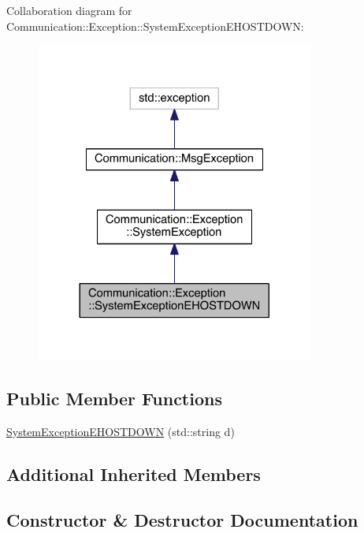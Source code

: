 Collaboration diagram for Communication\+:\+:Exception\+:\+:System\+Exception\+E\+H\+O\+S\+T\+D\+O\+W\+N\+:\nopagebreak
\begin{figure}[H]
\begin{center}
\leavevmode
\includegraphics[width=260pt]{class_communication_1_1_exception_1_1_system_exception_e_h_o_s_t_d_o_w_n__coll__graph}
\end{center}
\end{figure}
\subsection*{Public Member Functions}
\begin{DoxyCompactItemize}
\item 
\hyperlink{class_communication_1_1_exception_1_1_system_exception_e_h_o_s_t_d_o_w_n_ac520fab973baa441d5e67d68ac7cbdc7}{System\+Exception\+E\+H\+O\+S\+T\+D\+O\+W\+N} (std\+::string d)
\end{DoxyCompactItemize}
\subsection*{Additional Inherited Members}


\subsection{Constructor \& Destructor Documentation}
\hypertarget{class_communication_1_1_exception_1_1_system_exception_e_h_o_s_t_d_o_w_n_ac520fab973baa441d5e67d68ac7cbdc7}{}
